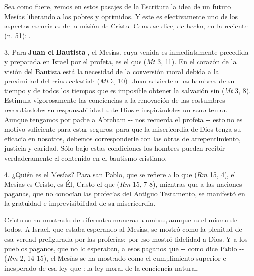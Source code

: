 \begin{body}
\begin{body}
		Sea como fuere, vemos en estos pasajes de la Escritura la idea de un futuro Mesías liberando a los pobres y oprimidos. Y este es efectivamente uno de los aspectos esenciales de la misión de Cristo. Como se dice, de hecho, en la reciente  (n. 51): .
		
		3. Para \textbf{Juan el Bautista} , el Mesías, cuya venida es inmediatamente precedida y preparada en Israel por el profeta, es el que  (\emph{Mt} 3, 11). En el corazón de la visión del Bautista está la necesidad de la conversión moral debida a la proximidad del reino celestial:  (\emph{Mt} 3, 10). Juan advierte a los hombres de su tiempo y de todos los tiempos que es imposible obtener la salvación sin  (\emph{Mt} 3, 8). Estimula vigorosamente las conciencias a la renovación de las costumbres recordándoles su responsabilidad ante Dios e inspirándoles un sano temor. Aunque tengamos por padre a Abraham -\/- nos recuerda el profeta -\/- esto no es motivo suficiente para estar seguros: para que la misericordia de Dios tenga su eficacia en nosotros, debemos corresponderle con las obras de arrepentimiento, justicia y caridad. Sólo bajo estas condiciones los hombres pueden recibir verdaderamente el  contenido en el bautismo cristiano.
		
		4. ¿Quién es el Mesías? Para san Pablo, que se refiere a lo que  (\emph{Rm} 15, 4), el Mesías es Cristo, es Él, Cristo el que  (\emph{Rm} 15, 7-8), mientras que a las naciones paganas, que no conocían las profecías del Antiguo Testamento, se manifestó en la gratuidad e imprevisibilidad de su misericordia.
		
		Cristo se ha mostrado de diferentes maneras a ambos, aunque es el mismo  de todos. A Israel, que estaba esperando al Mesías, se mostró como la plenitud de esa verdad prefigurada por las profecías: por eso mostró fidelidad a Dios. Y a los pueblos paganos, que no lo esperaban, a esos paganos que -\/- como dice Pablo -\/-  (\emph{Rm} 2, 14-15), el Mesías se ha mostrado como el cumplimiento superior e inesperado de esa ley que : la ley moral de la conciencia natural.
		

\end{body}
\end{body}
